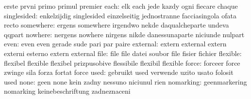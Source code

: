                            erste                     prvni
                           primo                     primul
                           premier
                     each: elk                       each
                           jede                      kazdy
                           ogni                      fiecare
                           chaque
              singlesided: enkelzijdig               singlesided
                           einzelseitig              jednostranne
                           facciasingola             ofata
                           recto
                somewhere: ergens                    somewhere
                           irgendwo                  nekde
                           daqualcheparte            undeva
                           qqpart
                  nowhere: nergens                   nowhere
                           nirgens                   nikde
                           danessunaparte            niciunde
                           nulpart
                     even: even                      even
                           gerade                    sude
                           pari                      par
                           paire
                 external: extern                    external
                           extern                    externi
                           esterno                   extern
                           external
                     file: file                      file
                           datei                     soubor
                           file                      fisier
                           fichier
                 flexible: flexibel                  flexible
                           flexibel                  prizpusobive
                           flessibile                flexibil
                           flexible
                    force: forceer                   force
                           zwinge                    sila
                           forza                     fortat
                           force
                     used: gebruikt                  used
                           verwende                  uzito
                           usato                     folosit
                           used
                     none: geen                      none
                           kein                      zadny
                           nessuno                   niciunul
                           rien
                nomarking: geenmarkering             nomarking
                           keinebeschriftung         zadneznaceni
